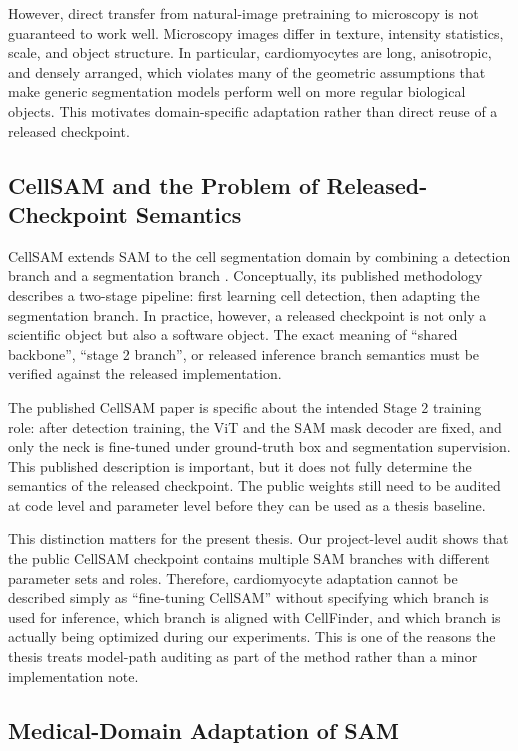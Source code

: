 However, direct transfer from natural-image pretraining to microscopy is not guaranteed to work well. Microscopy images differ in texture, intensity statistics, scale, and object structure. In particular, cardiomyocytes are long, anisotropic, and densely arranged, which violates many of the geometric assumptions that make generic segmentation models perform well on more regular biological objects. This motivates domain-specific adaptation rather than direct reuse of a released checkpoint.

\subsection{CellSAM and the Problem of Released-Checkpoint Semantics}\label{cellsam-and-the-problem-of-released-checkpoint-semantics}

CellSAM extends SAM to the cell segmentation domain by combining a detection branch and a segmentation branch \cite{israel2024cellsam}. Conceptually, its published methodology describes a two-stage pipeline: first learning cell detection, then adapting the segmentation branch. In practice, however, a released checkpoint is not only a scientific object but also a software object. The exact meaning of ``shared backbone'', ``stage 2 branch'', or released inference branch semantics must be verified against the released implementation.

The published CellSAM paper is specific about the intended Stage 2 training role: after detection training, the ViT and the SAM mask decoder are fixed, and only the neck is fine-tuned under ground-truth box and segmentation supervision. This published description is important, but it does not fully determine the semantics of the released checkpoint. The public weights still need to be audited at code level and parameter level before they can be used as a thesis baseline.

This distinction matters for the present thesis. Our project-level audit shows that the public CellSAM checkpoint contains multiple SAM branches with different parameter sets and roles. Therefore, cardiomyocyte adaptation cannot be described simply as ``fine-tuning CellSAM'' without specifying which branch is used for inference, which branch is aligned with CellFinder, and which branch is actually being optimized during our experiments. This is one of the reasons the thesis treats model-path auditing as part of the method rather than a minor implementation note.

\subsection{Medical-Domain Adaptation of SAM}\label{medical-domain-adaptation-of-sam}

